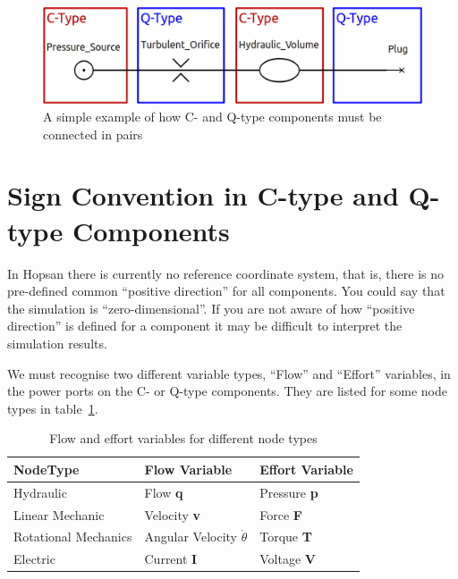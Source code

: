 \documentclass[a4paper,pdftex]{article}
\begin{document}
\begin{figure}[htb]
\includegraphics[width=1.0\linewidth]{gfx/cqs_startvalues/simplecqsystem.png}
\caption{A simple example of how C- and Q-type components must be connected in pairs}
\label{fig:simplecqsystem}
\end{figure}

\section{Sign Convention in C-type and Q-type Components}
In Hopsan there is currently no reference coordinate system, that is, there is no pre-defined common \enquote{positive direction} for all components.
You could say that the simulation is \enquote{zero-dimensional}.
If you are not aware of how \enquote{positive direction} is defined for a component it may be difficult to interpret the simulation results.


We must recognise two different variable types, \enquote{Flow} and \enquote{Effort} variables, in the power ports on the C- or Q-type components. 
They are listed for some node types in table~\ref{tab:floweffortvariables}.

\begin{table}[ht]
 \begin{tabular}{l|l|l}
   NodeType & Flow Variable & Effort Variable\\
   \hline
   Hydraulic & Flow \textbf{q} & Pressure \textbf{p} \\
   Linear Mechanic & Velocity \textbf{v} & Force \textbf{F}\\
   Rotational Mechanics & Angular Velocity $\dot{\theta}$ & Torque \textbf{T}\\
   Electric & Current \textbf{I} & Voltage \textbf{V}
 \end{tabular}
 \caption{Flow and effort variables for different node types}
 \label{tab:floweffortvariables}
\end{table}
\end{document}
